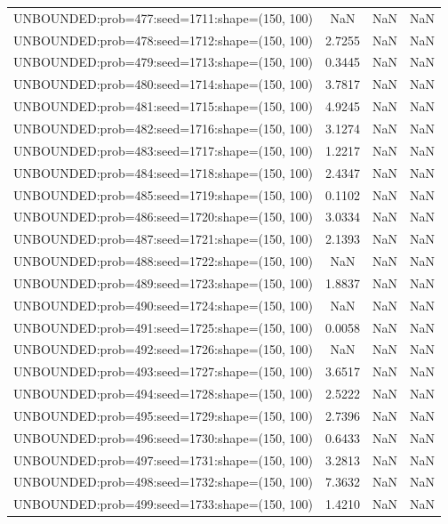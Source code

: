\begin{longtable}{lccc}
UNBOUNDED:prob=477:seed=1711:shape=(150, 100) &     NaN &   NaN &    NaN \\
UNBOUNDED:prob=478:seed=1712:shape=(150, 100) &  2.7255 &   NaN &    NaN \\
UNBOUNDED:prob=479:seed=1713:shape=(150, 100) &  0.3445 &   NaN &    NaN \\
UNBOUNDED:prob=480:seed=1714:shape=(150, 100) &  3.7817 &   NaN &    NaN \\
UNBOUNDED:prob=481:seed=1715:shape=(150, 100) &  4.9245 &   NaN &    NaN \\
UNBOUNDED:prob=482:seed=1716:shape=(150, 100) &  3.1274 &   NaN &    NaN \\
UNBOUNDED:prob=483:seed=1717:shape=(150, 100) &  1.2217 &   NaN &    NaN \\
UNBOUNDED:prob=484:seed=1718:shape=(150, 100) &  2.4347 &   NaN &    NaN \\
UNBOUNDED:prob=485:seed=1719:shape=(150, 100) &  0.1102 &   NaN &    NaN \\
UNBOUNDED:prob=486:seed=1720:shape=(150, 100) &  3.0334 &   NaN &    NaN \\
UNBOUNDED:prob=487:seed=1721:shape=(150, 100) &  2.1393 &   NaN &    NaN \\
UNBOUNDED:prob=488:seed=1722:shape=(150, 100) &     NaN &   NaN &    NaN \\
UNBOUNDED:prob=489:seed=1723:shape=(150, 100) &  1.8837 &   NaN &    NaN \\
UNBOUNDED:prob=490:seed=1724:shape=(150, 100) &     NaN &   NaN &    NaN \\
UNBOUNDED:prob=491:seed=1725:shape=(150, 100) &  0.0058 &   NaN &    NaN \\
UNBOUNDED:prob=492:seed=1726:shape=(150, 100) &     NaN &   NaN &    NaN \\
UNBOUNDED:prob=493:seed=1727:shape=(150, 100) &  3.6517 &   NaN &    NaN \\
UNBOUNDED:prob=494:seed=1728:shape=(150, 100) &  2.5222 &   NaN &    NaN \\
UNBOUNDED:prob=495:seed=1729:shape=(150, 100) &  2.7396 &   NaN &    NaN \\
UNBOUNDED:prob=496:seed=1730:shape=(150, 100) &  0.6433 &   NaN &    NaN \\
UNBOUNDED:prob=497:seed=1731:shape=(150, 100) &  3.2813 &   NaN &    NaN \\
UNBOUNDED:prob=498:seed=1732:shape=(150, 100) &  7.3632 &   NaN &    NaN \\
UNBOUNDED:prob=499:seed=1733:shape=(150, 100) &  1.4210 &   NaN &    NaN \\

\end{longtable}
